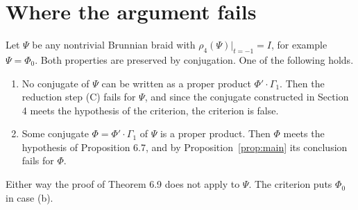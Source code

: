 \documentclass[11pt]{amsart}
\theoremstyle{remark}
\newcommand{\at}{\big|_{t=-1}}
\begin{document}
\section{Where the argument fails}

Let $\Psi$ be any nontrivial Brunnian braid with $\rho_4(\Psi)\at=I$, for example $\Psi=\Phi_0$. Both properties are preserved by conjugation. One of the following holds.
\begin{enumerate}
\item[(a)] No conjugate of $\Psi$ can be written as a proper product $\Phi'\cdot\Gamma_1$. Then the reduction step (C) fails for $\Psi$, and since the conjugate constructed in Section 4 meets the hypothesis of the criterion, the criterion is false.
\item[(b)] Some conjugate $\Phi=\Phi'\cdot\Gamma_1$ of $\Psi$ is a proper product. Then $\Phi$ meets the hypothesis of Proposition 6.7, and by Proposition~\ref{prop:main} its conclusion fails for $\Phi$.
\end{enumerate}
Either way the proof of Theorem 6.9 does not apply to $\Psi$. The criterion puts $\Phi_0$ in case (b).
\end{document}
